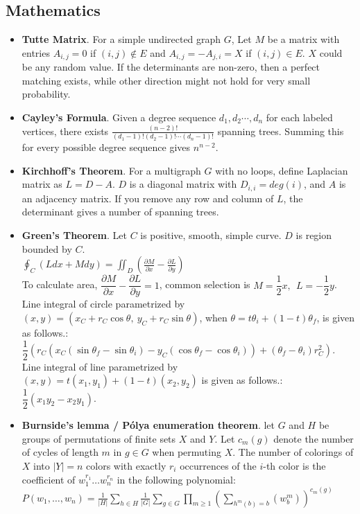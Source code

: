 \documentclass[landscape, 8pt, a4paper, oneside, twocolumn]{extarticle}
\begin{document}
\subsection {Mathematics}
\begin{itemize}
	\item \textbf{Tutte Matrix}. For a simple undirected graph $G$, Let $M$ be a matrix with entries $A_{i, j} = 0$ if $(i, j) \notin E$ and $A_{i, j} = -A_{j, i} = X$ if $(i, j) \in E$. $X$ could be any random value. If the determinants are non-zero, then a perfect matching exists, while other direction might not hold for very small probability.
	\item \textbf{Cayley's Formula}. Given a degree sequence $d_1, d_2 \cdots, d_n$ for each labeled vertices, there exists $\frac{(n-2)!}{(d_1 - 1)!(d_2 - 1)! \cdots (d_n - 1)!}$ spanning trees. Summing this for every possible degree sequence gives $n^{n-2}$. 
	\item \textbf{Kirchhoff's Theorem}. For a multigraph $G$ with no loops, define Laplacian matrix as $L = D - A$. $D$ is a diagonal matrix with $D_{i, i} = deg(i)$, and $A$ is an adjacency matrix. If you remove any row and column of $L$, the determinant gives a number of spanning trees.
	\item \textbf{Green's Theorem}. Let $C$ is positive, smooth, simple curve. $D$ is region bounded by $C$. \\
	{
    	\large
    	$\oint_C (L dx + M dy)  = \iint_D (\frac{\partial M}{\partial x} - \frac{\partial L}{\partial y}) $ 
    }\\
    
    To calculate area, $\dfrac{\partial M}{\partial x} - \dfrac{\partial L}{\partial y} = 1$, common selection is $M = \dfrac{1}{2} x, \ \ L = -\dfrac{1}{2} y$. \\
    
    Line integral of circle parametrized by $(x, y) = (x_C + r_C \cos \theta, \ y_C + r_C \sin \theta)$, when $\theta = t \theta_i + (1 - t) \theta_f$, is given as follows.:  $\dfrac{1}{2}( r_C (x_C (\sin \theta_f - \sin \theta_i) - y_C (\cos \theta_f - \cos \theta_i) ) + (\theta_f - \theta_i) r_C ^ 2)$.  \\
    
    Line integral of line parametrized by $(x, y) = t(x_1, y_1) + (1-t)(x_2, y_2)$ is given as follows.: $\dfrac{1}{2} (x_1 y_2 - x_2 y_1)$.
    \item \textbf{Burnside's lemma / Pólya enumeration theorem}. let $G$ and $H$ be groups of permutations of finite sets $X$ and $Y$. Let $c_m(g)$ denote the number of cycles of length $m$ in $g \in G$ when permuting $X$. The number of colorings of $X$ into $\left|Y\right|=n$ colors with exactly $r_i$ occurrences of the $i$-th color is the coefficient of $w_1^{r_1}\ldots w_n^{r_n}$ in the following polynomial: \\
    $P(w_1,\ldots ,w_n)=\frac{1}{\left|H\right|}\sum_{h\in H}\frac{1}{\left|G\right|}\sum_{g\in G}\prod_{m\ge 1}(\sum_{h^m(b)=b}(w_b^m))^{c_m(g)}$ \\


\end{itemize}
\end{document}
